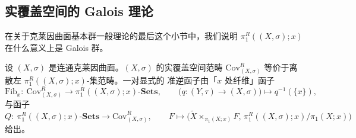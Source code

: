 \subsection{实覆盖空间的 Galois 理论}
\label{sec:02.2.3}

在关于克莱因曲面基本群一般理论的最后这个小节中，我们说明
$\pi^R_1((X,\sigma);x)$ 在什么意义上是 Galois 群。

\begin{theorem}\label{thm:2.2.21}
设 $(X,\sigma)$ 是连通克莱因曲面。$(X,\sigma)$ 的实覆盖空间范畴
$\mathrm{Cov}^R_{(X,\sigma)}$ 等价于离散左 $\pi^R_1((X,\sigma);x)$-集范畴。一对显式的
准逆函子由「$x$ 处纤维」函子
\[
\mathrm{Fib}_x:\ \mathrm{Cov}^R_{(X,\sigma)}\longrightarrow
\pi^R_1((X,\sigma);x)\text{-}\mathbf{Sets},
\qquad \bigl(q:(Y,\tau)\to(X,\sigma)\bigr)\longmapsto q^{-1}(\{x\}),
\]
与函子
\[
Q:\ \pi^R_1((X,\sigma);x)\text{-}\mathbf{Sets}\longrightarrow
\mathrm{Cov}^R_{(X,\sigma)},
\qquad F\longmapsto\bigl(\tilde X\times_{\pi_1(X;x)}F,\,
\pi^R_1((X,\sigma);x)/\pi_1(X;x)\bigr)
\]
给出。
\end{theorem}

